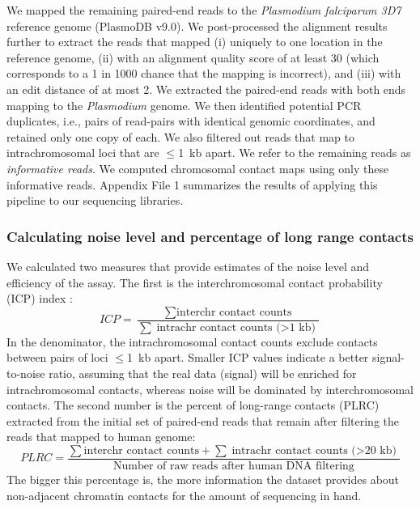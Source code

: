We mapped the remaining paired-end reads to the \emph{Plasmodium falciparum 3D7}
reference genome (PlasmoDB v9.0). We post-processed the alignment results further
to extract the reads that mapped (i) uniquely to one location in the reference
genome, (ii) with an alignment quality score of at least 30 (which corresponds to
a 1 in 1000 chance that the mapping is incorrect), and (iii) with an edit distance
of at most 2. We extracted the paired-end reads with both ends mapping to the
{\em Plasmodium} genome. We then identified potential PCR duplicates, i.e., pairs
of read-pairs with identical genomic coordinates, and retained only one copy of
each. We also filtered out reads that map to intrachromosomal loci that are
$\le$1~kb apart. We refer to the remaining reads as \emph{informative reads}. We
computed chromosomal contact maps using only these informative reads. Appendix
File 1 summarizes the results of applying this pipeline to our sequencing libraries.


\subsubsection{Calculating noise level and percentage of long range contacts}
\label{met:ICP}
We calculated two measures that provide estimates of the noise level and efficiency
of the assay. The first is the interchromosomal contact probability (ICP)
index \citep{kalhor:genome}:
\[
ICP=\frac{\sum{\text{interchr contact counts}}} {\sum{\text{intrachr contact counts ($>$1 kb)}}}
\]
In the denominator, the intrachromosomal contact counts exclude contacts between
pairs of loci $\le$1~kb apart. Smaller ICP values indicate a better signal-to-noise
ratio, assuming that the real data (signal) will be enriched for intrachromosomal
contacts, whereas noise will be dominated by interchromosomal contacts. The second
number is the percent of long-range contacts (PLRC) extracted from the initial set
of paired-end reads that remain after filtering the reads that mapped to human genome:
\[
PLRC=\frac{\sum{\text{interchr contact counts}} + \sum{\text{intrachr contact counts ($>$20 kb)}}} {\text{Number of raw reads after human DNA filtering}}
\]
The bigger this percentage is, the more information the dataset provides about
non-adjacent chromatin contacts for the amount of sequencing in hand.


